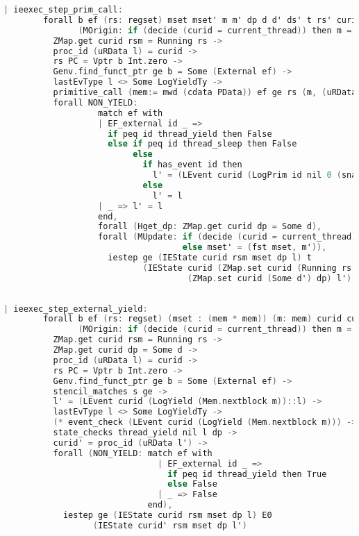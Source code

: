\begin{lstlisting}[language=C]
    | ieexec_step_prim_call:
        forall b ef (rs: regset) mset mset' m m' dp d d' ds' t rs' curid rsm l l'
               (MOrigin: if (decide (curid = current_thread)) then m = fst mset else m = snd mset),
          ZMap.get curid rsm = Running rs ->
          proc_id (uRData l) = curid ->
          rs PC = Vptr b Int.zero ->
          Genv.find_funct_ptr ge b = Some (External ef) ->
          lastEvType l <> Some LogYieldTy ->
          primitive_call (mem:= mwd (cdata PData)) ef ge rs (m, (uRData l, d)) t rs' (m', (ds', d')) ->
          forall NON_YIELD: 
                   match ef with
                   | EF_external id _ => 
                     if peq id thread_yield then False
                     else if peq id thread_sleep then False
                          else
                            if has_event id then
                              l' = (LEvent curid (LogPrim id nil 0 (snap_func d)) :: l)
                            else
                              l' = l
                   | _ => l' = l
                   end,
                   forall (Hget_dp: ZMap.get curid dp = Some d),
                   forall (MUpdate: if (decide (curid = current_thread)) then mset' = (m', snd mset)
                                    else mset' = (fst mset, m')),
                     iestep ge (IEState curid rsm mset dp l) t 
                            (IEState curid (ZMap.set curid (Running rs') rsm) mset' 
                                     (ZMap.set curid (Some d') dp) l')
                            
\end{lstlisting}

\begin{lstlisting}[language=C]
    | ieexec_step_external_yield:
        forall b ef (rs: regset) (mset : (mem * mem)) (m: mem) curid curid' rsm s l l' dp d
               (MOrigin: if (decide (curid = current_thread)) then m = fst mset else m = snd mset),
          ZMap.get curid rsm = Running rs ->
          ZMap.get curid dp = Some d ->
          proc_id (uRData l) = curid ->
          rs PC = Vptr b Int.zero ->
          Genv.find_funct_ptr ge b = Some (External ef) ->
          stencil_matches s ge ->
          l' = (LEvent curid (LogYield (Mem.nextblock m))::l) ->
          lastEvType l <> Some LogYieldTy ->
          (* event_check (LEvent curid (LogYield (Mem.nextblock m))) -> *)
          state_checks thread_yield nil l dp ->
          curid' = proc_id (uRData l') ->
          forall (NON_YIELD: match ef with
                               | EF_external id _ => 
                                 if peq id thread_yield then True
                                 else False
                               | _ => False
                             end),
            iestep ge (IEState curid rsm mset dp l) E0
                  (IEState curid' rsm mset dp l')

\end{lstlisting}

